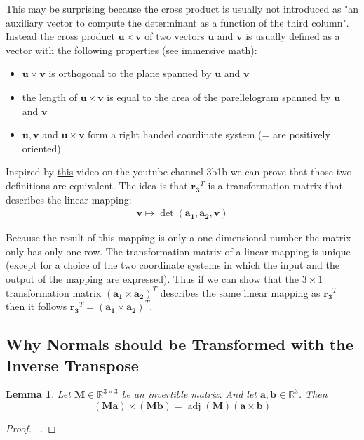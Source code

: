 \documentclass{article}
\newtheorem{lemma}{Lemma}
\newcommand{\R}{\mathbb{R}}
\newcommand{\vctr}[1]{\mathbf{#1}}
\newcommand{\mat}[1]{\mathbf{#1}}
\newcommand{\matCol}[1]{\vctr{a_{#1}}}
\DeclareMathOperator{\adj}{adj}
\begin{document}
This may be surprising because the cross product is usually not introduced as "an auxiliary vector to compute the determinant as a function of the third column". Instead the cross product \(\vctr{u} \times \vctr{v}\) of two vectors \(\vctr{u}\) and \(\vctr{v}\) is usually defined as a vector with the following properties (see \href{http://immersivemath.com/ila/ch04_vectorproduct/ch04.html#sec_vp_definition}{immersive math}):
\begin{itemize}
\item \(\vctr{u} \times \vctr{v}\) is orthogonal to the plane spanned by \(\vctr{u}\) and \(\vctr{v}\)
\item the length of \(\vctr{u} \times \vctr{v}\) is equal to the area of the parellelogram spanned by \(\vctr{u}\) and \(\vctr{v}\)
\item \(\vctr{u}, \vctr{v}\) and \(\vctr{u} \times \vctr{v}\) form a right handed coordinate system (= are positively oriented)
\end{itemize}

Inspired by \href{https://youtu.be/BaM7OCEm3G0}{this} video on the youtube channel 3b1b we can prove that those two definitions are equivalent.
The idea is that \(\vctr{r_3}^T\) is a transformation matrix that describes the linear mapping:
\begin{align*}
\vctr{v} \mapsto \det(\matCol{1}, \matCol{2}, \vctr{v})
\end{align*}

Because the result of this mapping is only a one dimensional number the matrix only has only one row. 
The transformation matrix of a linear mapping is unique (except for a choice of the two coordinate systems in which the input and the output of the mapping are expressed). 
Thus if we can show that the \(3\times 1\) transformation matrix \((\matCol{1} \times \matCol{2})^T\) describes the same linear mapping as \(\vctr{r_3}^T\) then it follows \(\vctr{r_3}^T = (\matCol{1} \times \matCol{2})^T\).



\subsection{Why Normals should be Transformed with the Inverse Transpose}

\begin{lemma}
Let \(\mat{M} \in \R^{3\times 3}\) be an invertible matrix. And let \(\vctr{a}, \vctr{b} \in \R^3\). Then
\[
(\mat{M}\vctr{a})\times(\mat{M}\vctr{b}) = \adj(\mat{M}) (\vctr{a} \times \vctr{b})
\]
\end{lemma}
\begin{proof}
 ...
\end{proof}
\end{document}
